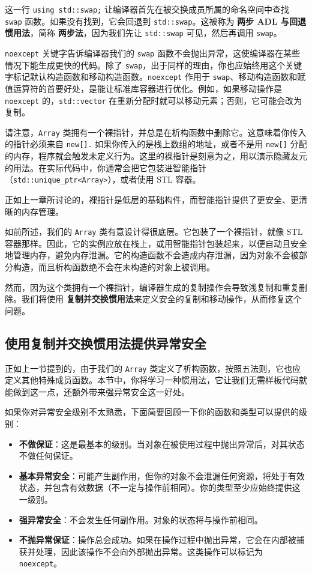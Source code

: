 这一行 \texttt{using std::\allowbreak{}swap;\allowbreak{}} 让编译器首先在被交换成员所属的命名空间中查找 \texttt{swap} 函数。如果没有找到，它会回退到 \texttt{std::swap}。这被称为 \textbf{两步 ADL 与回退惯用法}，简称 \textbf{两步法}，因为我们先让 \texttt{std::swap} 可见，然后再调用 \texttt{swap}。

\texttt{noexcept} 关键字告诉编译器我们的 \texttt{swap} 函数不会抛出异常，这使编译器在某些情况下能生成更快的代码。除了 \texttt{swap}，出于同样的理由，你也应始终用这个关键字标记默认构造函数和移动构造函数。\texttt{noexcept} 作用于 \texttt{swap}、移动构造函数和赋值运算符的首要好处，是能让标准库容器进行优化。例如，如果移动操作是 \texttt{noexcept} 的，\texttt{std::\allowbreak{}vector} 在重新分配时就可以移动元素；否则，它可能会改为复制。

\label{idx:531}
请注意，\texttt{Array} 类拥有一个裸指针，并总是在析构函数中删除它。这意味着你传入的指针必须来自 \texttt{new[].} 如果你传入的是栈上数组的地址，或者不是用 \texttt{new[]} 分配的内存，程序就会触发未定义行为。这里的裸指针是刻意为之，用以演示隐藏友元的用法。在实际代码中，你通常会把它包装进智能指针（\texttt{std::\allowbreak{}unique\_\allowbreak{}ptr<Array>}），或者使用 STL 容器。

正如上一章所讨论的，裸指针是低层的基础构件，而智能指针提供了更安全、更清晰的内存管理。

如前所述，我们的 \texttt{Array} 类有意设计得很底层。它包装了一个裸指针，就像 STL 容器那样。因此，它的实例应放在栈上，或用智能指针包装起来，以便自动且安全地管理内存，避免内存泄漏。它的构造函数不会造成内存泄漏，因为对象不会被部分构造，而且析构函数绝不会在未构造的对象上被调用。

\label{idx:532}
然而，因为这个类拥有一个裸指针，编译器生成的复制操作会导致浅复制和重复删除。我们将使用 \textbf{复制并交换惯用法}来定义安全的复制和移动操作，从而修复这个问题。

\subsection{使用复制并交换惯用法提供异常安全}

\label{idx:533}
\label{idx:534}
正如上一节提到的，由于我们的 \texttt{Array} 类定义了析构函数，按照五法则，它也应定义其他特殊成员函数。本节中，你将学习一种惯用法，它让我们无需样板代码就能做到这一点，还额外带来强异常安全这一好处。

如果你对异常安全级别不太熟悉，下面简要回顾一下你的函数和类型可以提供的级别：

\begin{itemize}
\item \textbf{不做保证}：这是最基本的级别。当对象在被使用过程中抛出异常后，对其状态不做任何保证。
\item \textbf{基本异常安全}：可能产生副作用，但你的对象不会泄漏任何资源，将处于有效状态，并包含有效数据（不一定与操作前相同）。你的类型至少应始终提供这一级别。
\item \textbf{强异常安全}：不会发生任何副作用。对象的状态将与操作前相同。
\item \textbf{不抛异常保证}：操作总会成功。如果在操作过程中抛出异常，它会在内部被捕获并处理，因此该操作不会向外部抛出异常。这类操作可以标记为 \texttt{noexcept}。
\end{itemize}

